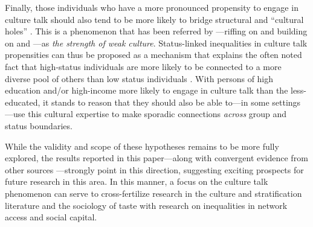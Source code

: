 Finally,  those individuals who have a more pronounced propensity to engage in culture talk should also tend to be more likely to bridge structural and ``cultural holes'' \citep{pachucki_breiger10, lizardo06a, lizardo11a}. This is a phenomenon that has been referred by \citet{schultz_breiger10}---riffing on \citet{granovetter73} and building on \citet{erickson96} and \citet{lizardo06a}---as \emph{the strength of weak culture}.  Status-linked inequalities in culture talk propensities can thus be proposed as a mechanism that explains the often noted fact that high-status individuals are more likely to be connected to a more diverse pool of others than low status individuals \citep{marsden87, erickson96, erickson08, lin_dumin86, lin99, goldstein_warren00, diprete_etal11}.   With persons of high education and/or high-income more likely to engage in culture talk than the less-educated, it stands to reason that they should also be able to---in some settings \citep{purcell07}---use this cultural expertise to make sporadic connections \emph{across} group and status boundaries.   

While the validity and scope of these hypotheses remains to be more fully explored, the results reported in this paper---along with convergent evidence from other sources \citep{lizardo06a, lizardo11a, lewis_etal09, rivera12, schultz_breiger10}---strongly point in this direction, suggesting exciting prospects for future research in this area.  In this manner, a focus on the culture talk phenomenon can serve to cross-fertilize research in the culture and stratification literature and the sociology of taste with research on inequalities in network access and social capital.  
